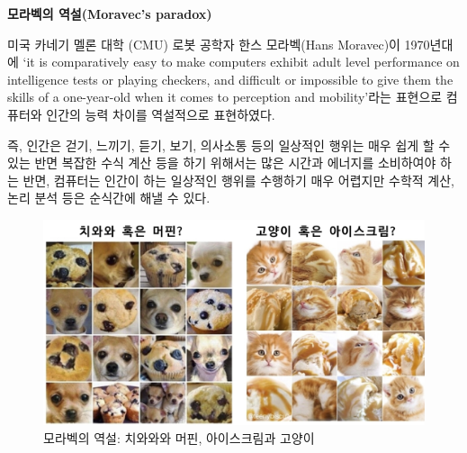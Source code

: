 \documentclass[smallextended]{svjour3}       %
\begin{document}
\begin{table}[H]
\centering
{}
\end{table}

\textbf{모라벡의 역설(Moravec's paradox)}

미국 카네기 멜론 대학 (CMU) 로봇 공학자 한스 모라벡(Hans Moravec)이
1970년대에 `it is comparatively easy to make computers exhibit adult
level performance on intelligence tests or playing checkers, and
difficult or impossible to give them the skills of a one-year-old when
it comes to perception and mobility'라는 표현으로 컴퓨터와 인간의 능력
차이를 역설적으로 표현하였다.

즉, 인간은 걷기, 느끼기, 듣기, 보기, 의사소통 등의 일상적인 행위는 매우
쉽게 할 수 있는 반면 복잡한 수식 계산 등을 하기 위해서는 많은 시간과
에너지를 소비하여야 하는 반면, 컴퓨터는 인간이 하는 일상적인 행위를
수행하기 매우 어렵지만 수학적 계산, 논리 분석 등은 순식간에 해낼 수
있다.

\begin{figure}
\centering
\includegraphics{fig/moravec-paradox.png}
\caption{모라벡의 역설: 치와와와 머핀, 아이스크림과 고양이}
\end{figure}
\end{document}
